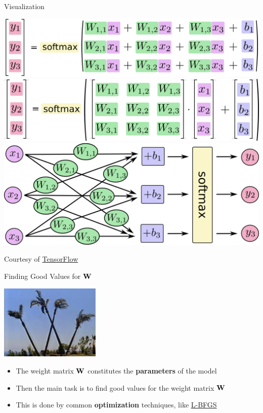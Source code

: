 \documentclass[xcolor=pdftex,x11names,table,hyperref]{beamer}
\begin{document}
\begin{frame}{Visualization}
\vspace{0.7em}
	\begin{center}
	\includegraphics[height=0.19\textheight]{images/softmax-regression-scalarequation.png} \\[1.1em]
	\includegraphics[height=0.19\textheight]{images/softmax-regression-vectorequation.png} \\[1.1em]
	\pause
	\includegraphics[height=0.29\textheight]{images/softmax-regression-scalargraph.png}
	\end{center}
\vspace{0.5em}
{\tiny Courtesy of \href{http://www.tensorflow.org/tutorials}{TensorFlow}}
\end{frame}


\begin{frame}{Finding Good Values for $\bf W$}
	\begin{center}
	\includegraphics[width=0.36\textwidth]{images/big-w.jpg}
	\end{center}
\begin{itemize}
	\item The weight matrix $\bf W$ constitutes the \textbf{parameters} of the model
	\item Then the main task is to find good values for the weight matrix $\bf W$
	\item This is done by common \textbf{optimization} techniques, like \href{https://en.wikipedia.org/wiki/Limited-memory_BFGS}{L-BFGS}
\end{itemize}
\end{frame}
\end{document}
